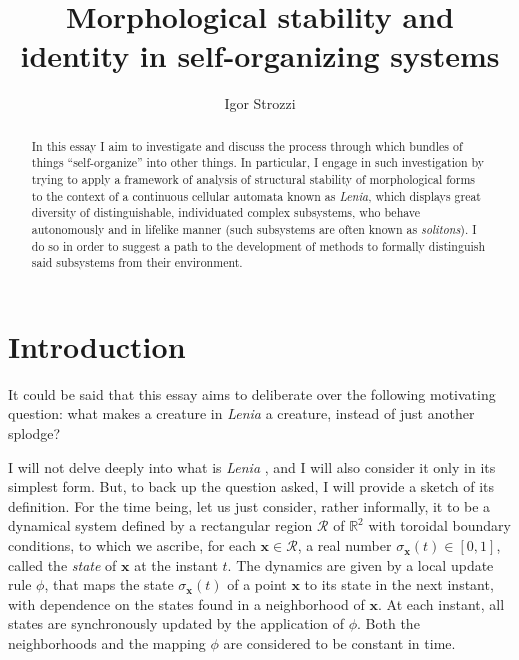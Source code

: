 \documentclass[12pt, a4paper]{article} %
\title{Morphological stability and identity in self-organizing systems} %
\author{
	Igor Strozzi %
}
\date{}
\theoremstyle{definition}
\begin{document}
	
	
	\maketitle %
	
	\begin{abstract}
		
		In this essay I aim to investigate and discuss the process through which bundles of things ``self-organize'' into other things. In particular, I engage in such investigation by trying to apply a  framework of analysis of structural stability of morphological forms to the context of a continuous cellular automata known as \textit{Lenia}, which displays great diversity of distinguishable, individuated complex subsystems, who behave autonomously and in lifelike manner (such subsystems are often known as \textit{solitons}). I do so in order to suggest a path to the development of methods to formally distinguish said subsystems from their environment. 
		
	\end{abstract}
	
	\section{Introduction} %
	
	It could be said that this essay aims to deliberate over the following motivating question: what makes a creature in \textit{Lenia} a creature, instead of just another splodge?
	
	I will not delve deeply into what is \textit{Lenia} \cite{Chan2019}, and I will also consider it only in its simplest form. But, to back up the question asked, I will provide a sketch of its definition. For the time being, let us just consider, rather informally, it to be a dynamical system defined by a rectangular region $\mathcal{R}$ of $\mathbb{R}^2$ with toroidal boundary conditions, to which we ascribe, for each $\mathbf{x} \in \mathcal{R}$, a real number $\sigma_{\mathbf{x}}(t) \in [0, 1]$, called the \textit{state} of $\mathbf{x}$ at the instant $t$. The dynamics are given by a local update rule $\phi$, that maps the state $\sigma_{\mathbf{x}}(t)$ of a point $\mathbf{x}$ to its state in the next instant, with dependence on the states found in a neighborhood of $\mathbf{x}$. At each instant, all states are synchronously updated by the application of $\phi$. Both the neighborhoods and the mapping $\phi$ are considered to be constant in time. 
	
\end{document}
